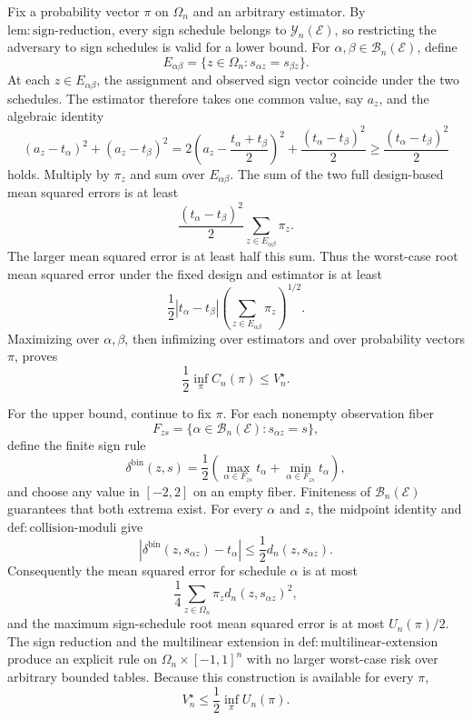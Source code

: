 Fix a probability vector \(\pi\) on \(\Omega_n\) and an arbitrary estimator.  By \(\mathrm{lem{:}sign\text{-}reduction}\), every sign schedule belongs to \(\mathcal Y_n(\mathcal E)\), so restricting the adversary to sign schedules is valid for a lower bound.  For \(\alpha,\beta\in\mathcal B_n(\mathcal E)\), define
\[
 E_{\alpha\beta}=\{z\in\Omega_n:s_{\alpha z}=s_{\beta z}\}.
\]
At each \(z\in E_{\alpha\beta}\), the assignment and observed sign vector coincide under the two schedules.  The estimator therefore takes one common value, say \(a_z\), and the algebraic identity
\[
 (a_z-t_\alpha)^2+(a_z-t_\beta)^2
 =2\left(a_z-\frac{t_\alpha+t_\beta}{2}\right)^2
   +\frac{(t_\alpha-t_\beta)^2}{2}
 \ge\frac{(t_\alpha-t_\beta)^2}{2}
\]
holds.  Multiply by \(\pi_z\) and sum over \(E_{\alpha\beta}\).  The sum of the two full design-based mean squared errors is at least
\[
 \frac{(t_\alpha-t_\beta)^2}{2}
 \sum_{z\in E_{\alpha\beta}}\pi_z.
\]
The larger mean squared error is at least half this sum.  Thus the worst-case root mean squared error under the fixed design and estimator is at least
\[
 \frac12|t_\alpha-t_\beta|
 \left(\sum_{z\in E_{\alpha\beta}}\pi_z\right)^{1/2}.
\]
Maximizing over \(\alpha,\beta\), then infimizing over estimators and over probability vectors \(\pi\), proves
\[
 \frac12\inf_\pi C_n(\pi)\le V_n^\star.
\]

For the upper bound, continue to fix \(\pi\).  For each nonempty observation fiber
\[
 F_{zs}=\{\alpha\in\mathcal B_n(\mathcal E):s_{\alpha z}=s\},
\]
define the finite sign rule
\[
 \delta^{\mathrm{bin}}(z,s)
 =\frac12\left(
    \max_{\alpha\in F_{zs}}t_\alpha
    +\min_{\alpha\in F_{zs}}t_\alpha
   \right),
\]
and choose any value in \([-2,2]\) on an empty fiber.  Finiteness of \(\mathcal B_n(\mathcal E)\) guarantees that both extrema exist.  For every \(\alpha\) and \(z\), the midpoint identity and \(\mathrm{def{:}collision\text{-}moduli}\) give
\[
 \left|\delta^{\mathrm{bin}}(z,s_{\alpha z})-t_\alpha\right|
 \le\frac12d_n(z,s_{\alpha z}).
\]
Consequently the mean squared error for schedule \(\alpha\) is at most
\[
 \frac14\sum_{z\in\Omega_n}\pi_zd_n(z,s_{\alpha z})^2,
\]
and the maximum sign-schedule root mean squared error is at most \(U_n(\pi)/2\).  The sign reduction and the multilinear extension in \(\mathrm{def{:}multilinear\text{-}extension}\) produce an explicit rule on \(\Omega_n\times[-1,1]^n\) with no larger worst-case risk over arbitrary bounded tables.  Because this construction is available for every \(\pi\),
\[
 V_n^\star\le\frac12\inf_\pi U_n(\pi).
\]

